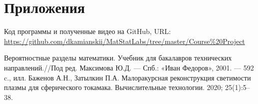 \documentclass[a4paper,12pt]{article} %
\begin{document}
	\section{Приложения}
	Код программы и полученные видео на GitHub, URL:
	\url{https://github.com/dkamianskii/MatStatLabs/tree/master/Course%20Project}
	\begin{thebibliography}{99}
		   Вероятностные разделы математики. Учебник для бакалавров технических направлений.//Под ред. Максимова Ю.Д. — Спб.: «Иван Федоров», 2001. — 592 c., илл.
		 Баженов А.Н., Затылкин П.А. Малоракурсная реконструкция светимости плазмы для сферического токамака. Вычислительные технологии. 2020; 25(1):5–38.
	\end{thebibliography}
\end{document}

